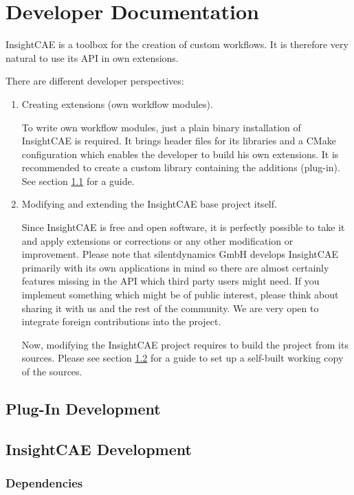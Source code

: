 \section{Developer Documentation}

InsightCAE is a toolbox for the creation of custom workflows.
It is therefore very natural to use its API in own extensions.

There are different developer perspectives:
\begin{enumerate}
\item Creating extensions (own workflow modules).

To write own workflow modules, just a plain binary installation of InsightCAE is required. 
It brings header files for its libraries and a CMake configuration which enables the developer to build his own extensions.
It is recommended to create a custom library containing the additions (plug-in).
See section \ref{sec:plugins} for a guide.

\item Modifying and extending the InsightCAE base project itself.

Since InsightCAE is free and open software, it is perfectly possible to take it and apply extensions or corrections or any other modification or improvement.
Please note that silentdynamics GmbH develops InsightCAE primarily with its own applications in mind so there are almost certainly features missing in the API which third party users might need.
If you implement something which might be of public interest, please think about sharing it with us and the rest of the community. 
We are very open to integrate foreign contributions into the project.

Now, modifying the InsightCAE project requires to build the project from its sources. 
Please see section \ref{sec:insightcae_dev} for a guide to set up a self-built working copy of the sources.
\end{enumerate}

\subsection{Plug-In Development}
\label{sec:plugins}


\subsection{InsightCAE Development}
\label{sec:insightcae_dev}

\subsubsection{Dependencies}

